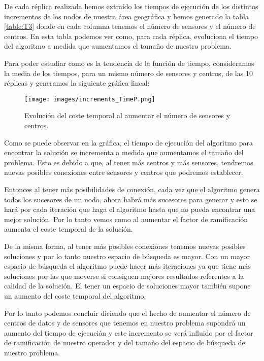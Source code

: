 \documentclass{article}
\begin{document}
\begin{enumerate}
  De cada réplica realizada hemos extraído los tiempos de ejecución de los distintos incrementos de los nodos de nuestra área geográfica y hemos generado la tabla \ref{table:T3} donde en cada columna tenemos el número de sensores y el número de centros. En esta tabla podemos ver como, para cada réplica, evoluciona el tiempo del algoritmo a medida que aumentamos el tamaño de nuestro problema.\par
  Para poder estudiar como es la tendencia de la función de tiempo, consideramos la media de los tiempos, para un mismo número de sensores y centros, de las 10 réplicas y generamos la siguiente gráfica lineal:

  \begin{figure}[ht]
    \centering
    \texttt{[image: images/increments\_TimeP.png]}\hfill
    \caption{Evolución del coste temporal al aumentar el número de sensores y centros.}
  \end{figure}

  Como se puede observar en la gráfica, el tiempo de ejecución del algoritmo para encontrar la solución se incrementa a medida que aumentamos el tamaño del problema. Esto es debido a que, al tener más centros y más sensores, tendremos nuevas posibles conexiones entre sensores y centros que podremos establecer.\par
  Entonces al tener más posibilidades de conexión, cada vez que el algoritmo genera todos los sucesores de un nodo, ahora habrá más sucesores para generar y esto se hará por cada iteración que haga el algoritmo hasta que no pueda encontrar una mejor solución. Por lo tanto vemos como al aumentar el factor de ramificación aumenta el coste temporal de la solución.\par
  De la misma forma, al tener más posibles conexiones tenemos nuevas posibles soluciones y por lo tanto nuestro espacio de búsqueda es mayor. Con un mayor espacio de búsqueda el algoritmo puede hacer más iteraciones ya que tiene más soluciones por las que moverse si consiguen mejores resultados referentes a la calidad de la solución. El tener un espacio de soluciones mayor también supone un aumento del coste temporal del algoritmo.\par
  Por lo tanto podemos concluir diciendo que el hecho de aumentar el número de centros de datos y de sensores que tenemos en nuestro problema supondrá un aumento del tiempo de ejecución y este incremento se verá influido por el factor de ramificación de nuestro operador y del tamaño del espacio de búsqueda de nuestro problema.


\end{enumerate}
\end{document}
